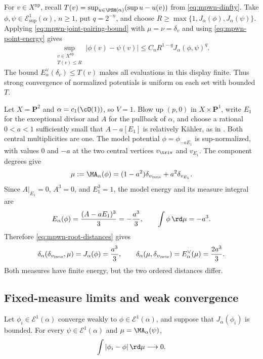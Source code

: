 For $v\in X^{\mathrm{np}}$, recall $T(v)=\sup_{u\in\PSH(\alpha)}(\sup u-u(v))$ from \eqref{eq:mpwn-dinfty}. Take $\phi,\psi\in\mathcal E^1_{\sup}(\alpha)$, $n\geq1$, put $q=2^{-n}$, and choose $R\geq\max\{1,J_\alpha(\phi),J_\alpha(\psi)\}$. Applying \eqref{eq:mpwn-joint-pairing-bound} with $\mu=\nu=\delta_v$ and using \eqref{eq:mpwn-point-energy} gives
\[
 \sup_{\substack{v\in X^{\mathrm{np}}\\T(v)\leq R}}
       |\phi(v)-\psi(v)|
       \leq C_n R^{1-q}J_\alpha(\phi,\psi)^q.
\tag{61.21e}\label{eq:mpwn-bounded-point-energy-evaluation}
\]
The bound $E_\alpha^\vee(\delta_v)\leq T(v)$ makes all evaluations in this display finite. Thus strong convergence of normalized potentials is uniform on each set with bounded $T$.

\begin{example}\label{ex:mpwn-asymmetric-surface-distance}
Let $X=\mathbf P^2$ and $\alpha=c_1(\cO(1))$, so $V=1$. Blow up $(p,0)$ in $X\times\mathbf P^1$, write $E_1$ for the exceptional divisor and $A$ for the pullback of $\alpha$, and choose a rational $0<a<1$ sufficiently small that $A-a[E_1]$ is relatively K\"ahler, as in . Both central multiplicities are one. The model potential $\phi=\phi_{-aE_1}$ is sup-normalized, with values $0$ and $-a$ at the two central vertices $v_{\triv}$ and $v_{E_1}$. The component degrees give
\[
 \mu:=\MA_\alpha(\phi)
       =(1-a^2)\delta_{v_{\triv}}+a^2\delta_{v_{E_1}}.
\]
Since $A|_{E_1}=0$, $A^3=0$, and $E_1^3=1$, the model energy and its measure integral are
\[
 E_\alpha(\phi)=\frac{(A-aE_1)^3}{3}=-\frac{a^3}{3},
 \qquad \int\phi\,\rd\mu=-a^3.
\]
Therefore \eqref{eq:mpwn-root-distances} gives
\[
 \delta_\alpha(\delta_{v_{\triv}},\mu)=J_\alpha(\phi)=\frac{a^3}{3},
 \qquad
 \delta_\alpha(\mu,\delta_{v_{\triv}})
       =E_\alpha^\vee(\mu)=\frac{2a^3}{3}.
\]
Both measures have finite energy, but the two ordered distances differ.
\end{example}


\subsection{Fixed-measure limits and weak convergence}
\label{subsec:mpwn-weak-limits}

\begin{lemma}\label{lem:mpwn-fixed-measure-integral}
Let $\phi_i\in\mathcal E^1(\alpha)$ converge weakly to
$\phi\in\mathcal E^1(\alpha)$, and suppose that $J_\alpha(\phi_i)$
is bounded.  For every $\psi\in\mathcal E^1(\alpha)$ and
$\mu=\MA_\alpha(\psi)$,
\[
                    \int|\phi_i-\phi|\,\rd\mu\longrightarrow0.
\]
\end{lemma}

